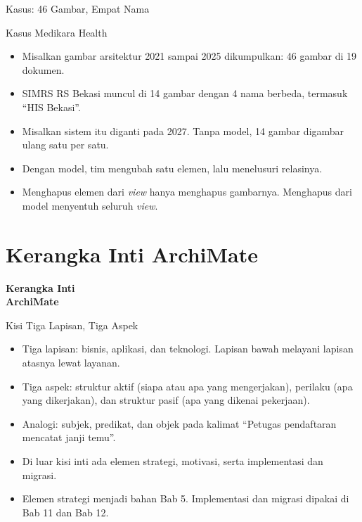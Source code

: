 \documentclass[aspectratio=169, table, 12pt]{beamer}
\begin{document}
\begin{frame}{{\Large Kasus: 46 Gambar, Empat Nama}}
  \begin{block}{Kasus Medikara Health}
    \small
    \begin{itemize}
      \item Misalkan gambar arsitektur 2021 sampai 2025 dikumpulkan: 46 gambar di 19 dokumen.
      \item SIMRS RS Bekasi muncul di 14 gambar dengan 4 nama berbeda, termasuk ``HIS Bekasi''.
      \item Misalkan sistem itu diganti pada 2027. Tanpa model, 14 gambar digambar ulang satu per satu.
      \item Dengan model, tim mengubah satu elemen, lalu menelusuri relasinya.
      \item Menghapus elemen dari \textit{view} hanya menghapus gambarnya. Menghapus dari model
            menyentuh seluruh \textit{view}.
    \end{itemize}
  \end{block}
\end{frame}

\section{Kerangka Inti ArchiMate}

\begin{frame}{\hfill}
  \centering
  \Huge{\textbf{Kerangka Inti\\ArchiMate}}
\end{frame}

\begin{frame}{{\Large Kisi Tiga Lapisan, Tiga Aspek}}
  \vspace{6pt}
  \small
  \begin{itemize}
    \item Tiga lapisan: bisnis, aplikasi, dan teknologi. Lapisan bawah melayani lapisan atasnya lewat
          layanan.
    \item Tiga aspek: struktur aktif (siapa atau apa yang mengerjakan), perilaku (apa yang dikerjakan),
          dan struktur pasif (apa yang dikenai pekerjaan).
    \item Analogi: subjek, predikat, dan objek pada kalimat ``Petugas pendaftaran mencatat janji temu''.
    \item Di luar kisi inti ada elemen strategi, motivasi, serta implementasi dan migrasi.
    \item Elemen strategi menjadi bahan Bab 5. Implementasi dan migrasi dipakai di Bab 11 dan Bab 12.
  \end{itemize}
\end{frame}
\end{document}

